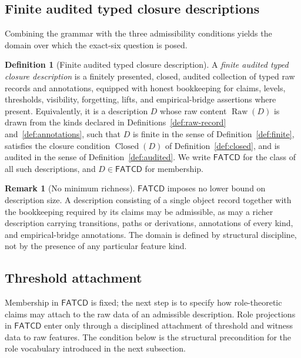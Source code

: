\documentclass[11pt]{article}
\theoremstyle{definition}
\newtheorem{definition}[theorem]{Definition}
\newtheorem{remark}[theorem]{Remark}
\newcommand{\FATCD}{\ensuremath{\mathsf{FATCD}}}
\newcommand{\Raw}[1]{\ensuremath{\operatorname{Raw}\!\left(#1\right)}}
\newcommand{\Closed}[1]{\ensuremath{\operatorname{Closed}\!\left(#1\right)}}
\begin{document}
\subsection{Finite audited typed closure descriptions}\label{subsec:fatcd}

Combining the grammar with the three admissibility conditions yields
the domain over which the exact-six question is posed.

\begin{definition}[Finite audited typed closure description]\label{def:fatcd}
A \emph{finite audited typed closure description} is a finitely presented,
closed, audited collection of typed raw records and annotations, equipped with
honest bookkeeping for claims, levels, thresholds, visibility, forgetting,
lifts, and empirical-bridge assertions where present. Equivalently, it is a
description \(D\) whose raw content \(\Raw{D}\) is drawn from the kinds
declared in Definitions~\ref{def:raw-record} and~\ref{def:annotations}, such
that \(D\) is finite in the sense of Definition~\ref{def:finite}, satisfies
the closure condition \(\Closed{D}\) of Definition~\ref{def:closed}, and is
audited in the sense of Definition~\ref{def:audited}. We write \FATCD{} for
the class of all such descriptions, and \(D \in \FATCD{}\) for membership.
\end{definition}

\begin{remark}[No minimum richness]\label{rem:fatcd-minimality}
\FATCD{} imposes no lower bound on description size. A description
consisting of a single object record together with the bookkeeping
required by its claims may be admissible, as may a richer description
carrying transitions, paths or derivations, annotations of every kind,
and empirical-bridge annotations. The domain is defined by structural
discipline, not by the presence of any particular feature kind.
\end{remark}

\subsection{Threshold attachment}\label{subsec:threshold-attachment}

Membership in \FATCD{} is fixed; the next step is to specify how
role-theoretic claims may attach to the raw data of an admissible
description. Role projections in \FATCD{} enter only through a
disciplined attachment of threshold and witness data to raw features.
The condition below is the structural precondition for the role
vocabulary introduced in the next subsection.
\end{document}

